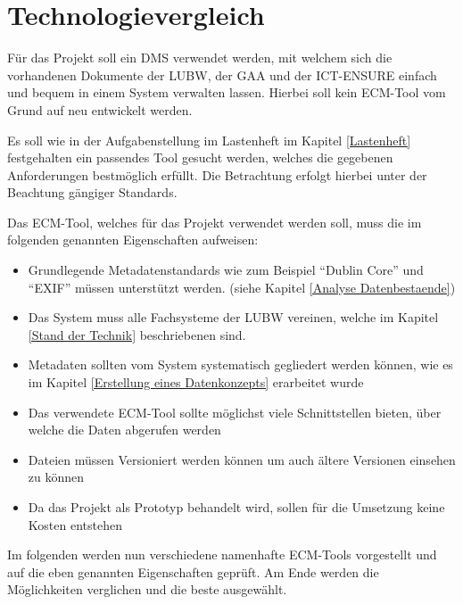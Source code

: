 \section{Technologievergleich}
F\"ur das Projekt soll ein \ac{DMS} verwendet werden, mit welchem sich die vorhandenen Dokumente der \ac{LUBW}, der \ac{GAA} und der \ac{ICT-ENSURE} einfach und bequem in einem System verwalten lassen. Hierbei soll kein \ac{ECM}-Tool vom Grund auf neu entwickelt werden. 

Es soll wie in der Aufgabenstellung im Lastenheft im Kapitel \ref{Lastenheft} festgehalten ein passendes Tool gesucht werden, welches die gegebenen Anforderungen bestm\"oglich erf\"ullt. Die Betrachtung erfolgt hierbei unter der Beachtung g\"angiger Standards.

Das \ac{ECM}-Tool, welches f\"ur das Projekt verwendet werden soll, muss die im folgenden genannten Eigenschaften aufweisen:

\begin{itemize}
 \item Grundlegende Metadatenstandards wie zum Beispiel "`Dublin Core"' und "`EXIF"' m\"ussen unterst\"utzt werden. (siehe Kapitel \ref{Analyse Datenbestaende})
 \item Das System muss alle Fachsysteme der \ac{LUBW} vereinen, welche im Kapitel \ref{Stand der Technik} beschriebenen sind.
 \item Metadaten sollten vom System systematisch gegliedert werden k\"onnen, wie es im Kapitel \ref{Erstellung eines Datenkonzepts} erarbeitet wurde
 \item Das verwendete \ac{ECM}-Tool sollte m\"oglichst viele Schnittstellen bieten, \"uber welche die Daten abgerufen werden
 \item Dateien m\"ussen Versioniert werden k\"onnen um auch \"altere Versionen einsehen zu k\"onnen
 \item Da das Projekt als Prototyp behandelt wird, sollen f\"ur die Umsetzung keine Kosten entstehen
\end{itemize}

Im folgenden werden nun verschiedene namenhafte \ac{ECM}-Tools vorgestellt und auf die eben genannten Eigenschaften gepr\"uft. Am Ende werden die M\"oglichkeiten verglichen und die beste ausgew\"ahlt.



